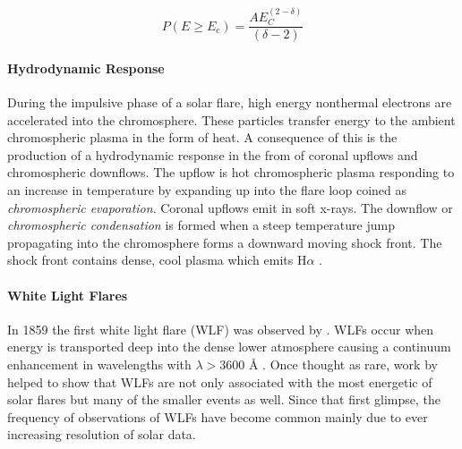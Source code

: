 \begin{equation}\label{pnth1}
P(E \geq E_{c}) = \frac{AE_{C}^{(2-\delta)}}{(\delta - 2)}
\end{equation}

\paragraph{Hydrodynamic Response}
During the impulsive phase of a solar flare, high energy nonthermal electrons are accelerated into the chromosphere. These particles transfer energy to the ambient chromospheric plasma in the form of heat. A consequence of this is the production of a hydrodynamic response in the from of coronal upflows and chromospheric downflows. The upflow is hot chromospheric plasma responding to an increase in temperature by expanding up into the flare loop coined as \emph{chromospheric evaporation}. Coronal upflows emit in soft x-rays. The downflow or \emph{chromospheric condensation} is formed when a steep temperature jump propagating into the chromosphere forms a downward moving shock front. The shock front contains dense, cool plasma which emits H$\alpha$ \citep{1981SoPh...73..269L, 1990ApJ...348..333C, 2015SoPh..tmp...61K}. 



\paragraph{White Light Flares}
In 1859 the first white light flare (WLF) was observed by \cite{1859MNRAS..20...13C}. 
WLFs occur when energy is transported deep into the dense lower atmosphere causing a continuum enhancement in wavelengths with $\lambda > 3600$ Å \citep{1983SoPh...88..275N}. 
Once thought as rare, work by \cite{2003A&A...409.1107M} helped to show that WLFs are not only associated with the most energetic of solar flares but many of the smaller events as well. Since that first glimpse, the frequency of observations of WLFs have become common mainly due to ever increasing resolution of solar data. 


